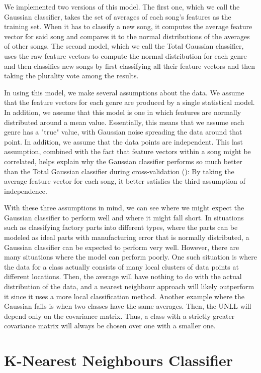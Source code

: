 \documentclass[journal,hidelinks]{IEEEtran}
\begin{document}
We implemented two versions of this model. The first one, which we call the Gaussian classifier, takes the set of averages of each song's features as the training set. When it has to classify a new song, it computes the average feature vector for said song and compares it to the normal distributions of the averages of other songs. The second model, which we call the Total Gaussian classifier, uses the raw feature vectors to compute the normal distribution for each genre and then classifies new songs by first classifying all their feature vectors and then taking the plurality vote among the results.

In using this model, we make several assumptions about the data. We assume that the feature vectors for each genre are produced by a single statistical model. In addition, we assume that this model is one in which features are normally distributed around a mean value. Essentially, this means that we assume each genre has a "true" value, with Gaussian noise spreading the data around that point. In addition, we assume that the data points are independent. This last assumption, combined with the fact that feature vectors within a song might be correlated, helps explain why the Gaussian classifier performs so much better than the Total Gaussian classifier during cross-validation (): By taking the average feature vector for each song, it better satisfies the third assumption of independence.

With these three assumptions in mind, we can see where we might expect the Gaussian classifier to perform well and where it might fall short. In situations such as classifying factory parts into different types, where the parts can be modeled as ideal parts with manufacturing error that is normally distributed, a Gaussian classifier can be expected to perform very well. However, there are many situations where the model can perform poorly. One such situation is where the data for a class actually consists of many local clusters of data points at different locations. Then, the average will have nothing to do with the actual distribution of the data, and a nearest neighbour approach will likely outperform it since it uses a more local classification method. Another example where the Gaussian fails is when two classes have the same averages. Then, the UNLL will depend only on the covariance matrix. Thus, a class with a strictly greater covariance matrix will always be chosen over one with a smaller one.

\section{K-Nearest Neighbours Classifier}
\label{sec:knn}
\end{document}
